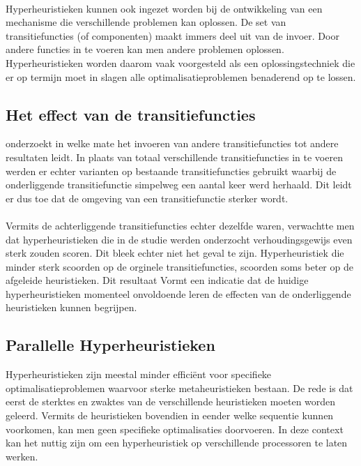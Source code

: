 \paragraph{}
Hyperheuristieken kunnen ook ingezet worden bij de ontwikkeling van een mechanisme die verschillende problemen kan oplossen. De set van transitiefuncties (of componenten) maakt immers deel uit van de invoer. Door andere functies in te voeren kan men andere problemen oplossen. Hyperheuristieken worden daarom vaak voorgesteld als een oplossingstechniek die er op termijn moet in slagen alle optimalisatieproblemen benaderend op te lossen.

\subsection{Het effect van de transitiefuncties}
\cite{misirEffect} onderzoekt in welke mate het invoeren van andere transitiefuncties tot andere resultaten leidt. In plaats van totaal verschillende transitiefuncties in te voeren werden er echter varianten op bestaande transitiefuncties gebruikt waarbij de onderliggende transitiefunctie simpelweg een aantal keer werd herhaald. Dit leidt er dus toe dat de omgeving van een transitiefunctie sterker wordt.

\paragraph{}
Vermits de achterliggende transitiefuncties echter dezelfde waren, verwachtte men dat hyperheuristieken die in de studie werden onderzocht verhoudingsgewijs even sterk zouden scoren. Dit bleek echter niet het geval te zijn. Hyperheuristiek die minder sterk scoorden op de orginele transitiefuncties, scoorden soms beter op de afgeleide heuristieken. Dit resultaat Vormt een indicatie dat de huidige hyperheuristieken momenteel onvoldoende leren de effecten van de onderliggende heuristieken kunnen begrijpen.

\subsection{Parallelle Hyperheuristieken}

Hyperheuristieken zijn meestal minder effici\"ent voor specifieke optimalisatieproblemen waarvoor sterke metaheuristieken bestaan. De rede is dat eerst de sterktes en zwaktes van de verschillende heuristieken moeten worden geleerd. Vermits de heuristieken bovendien in eender welke sequentie kunnen voorkomen, kan men geen specifieke optimalisaties doorvoeren. In deze context kan het nuttig zijn om een hyperheuristiek op verschillende processoren te laten werken.


